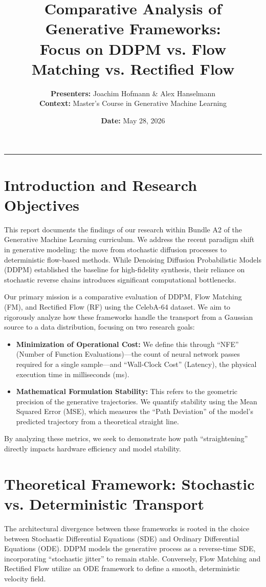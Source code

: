\documentclass[11pt,a4paper]{article}
\title{\textbf{Comparative Analysis of Generative Frameworks:\\ Focus on DDPM vs. Flow Matching vs. Rectified Flow}}
\author{\textbf{Presenters:} Joachim Hofmann \& Alex Hanselmann \\
\small \textbf{Context:} Master's Course in Generative Machine Learning}
\date{\textbf{Date:} May 28, 2026}
\begin{document}
\maketitle

\hrule
\vspace{0.4cm}

\section{Introduction and Research Objectives}
This report documents the findings of our research within Bundle A2 of the Generative Machine Learning curriculum\cite{87}. We address the recent paradigm shift in generative modeling: the move from stochastic diffusion processes to deterministic flow-based methods\cite{88}. While Denoising Diffusion Probabilistic Models (DDPM) established the baseline for high-fidelity synthesis, their reliance on stochastic reverse chains introduces significant computational bottlenecks\cite{88}.

Our primary mission is a comparative evaluation of DDPM, Flow Matching (FM), and Rectified Flow (RF) using the CelebA-64 dataset\cite{90}. We aim to rigorously analyze how these frameworks handle the transport from a Gaussian source to a data distribution, focusing on two research goals\cite{91}:
\begin{itemize}
    \item \textbf{Minimization of Operational Cost:} We define this through ``NFE'' (Number of Function Evaluations)---the count of neural network passes required for a single sample---and ``Wall-Clock Cost'' (Latency), the physical execution time in milliseconds (ms)\cite{91}.
    \item \textbf{Mathematical Formulation Stability:} This refers to the geometric precision of the generative trajectories\cite{92}. We quantify stability using the Mean Squared Error (MSE), which measures the ``Path Deviation'' of the model's predicted trajectory from a theoretical straight line\cite{90}.
\end{itemize}
By analyzing these metrics, we seek to demonstrate how path ``straightening'' directly impacts hardware efficiency and model stability\cite{90}.

\section{Theoretical Framework: Stochastic vs. Deterministic Transport}
The architectural divergence between these frameworks is rooted in the choice between Stochastic Differential Equations (SDE) and Ordinary Differential Equations (ODE)\cite{92}. DDPM models the generative process as a reverse-time SDE, incorporating ``stochastic jitter'' to remain stable\cite{88}. Conversely, Flow Matching and Rectified Flow utilize an ODE framework to define a smooth, deterministic velocity field\cite{91}.
\end{document}
